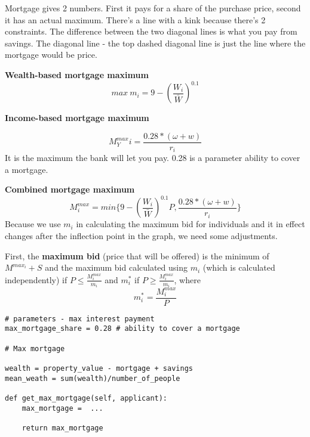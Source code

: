 {Mortgage gives 2 numbers. First it pays for a share of the purchase price, second it has an actual maximum. There's a line with a kink because there's 2 constraints.  The difference between the two diagonal lines is what you pay from savings. 
The diagonal line - the top dashed diagonal line is just the line where the mortgage would be price.

\textbf{Wealth-based  mortgage maximum} 
 \[max\ m_i = 9-\left(\frac{W_i}{\bar W}\right)^{0.1} \]


\textbf{Income-based  mortgage maximum}

\[M^{max}_Yi = \frac{0.28*(\omega+w)}{r_i}\] It is the maximum the bank will let you pay.  0.28 is a parameter \gls{ability to cover a mortgage}.
 
\textbf{Combined  mortgage maximum}
\[ M_i^{max} = min \{9-\left(\frac{W_i}{\bar W}\right)^{0.1}P,  \frac{0.28*(\omega+w)}{r_i} \}\]
Because we use $m_i$ in calculating the maximum bid for individuals and it in effect changes after the inflection point in the graph, we need some adjustments. 

First, the \textbf{maximum bid} (price that will be offered) is the minimum of $M^{max_i} +S$ and the maximum bid calculated using $m_i$ (which is calculated independently) if 
$P\le \frac{M_i^{max}}{m_i}$ 
and $m_i^*$ if 
$P\ge \frac{M_i^{max}}{m_i}$, where 
\[m_i^*=\frac{M_i^{max}}{P}\]

\begin{lstlisting}
# parameters - max interest payment 
max_mortgage_share = 0.28 # ability to cover a mortgage

# Max mortgage

wealth = property_value - mortgage + savings
mean_weath = sum(wealth)/number_of_people

def get_max_mortgage(self, applicant):
    max_mortgage =  ...
    
    return max_mortgage
\end{lstlisting}

}





